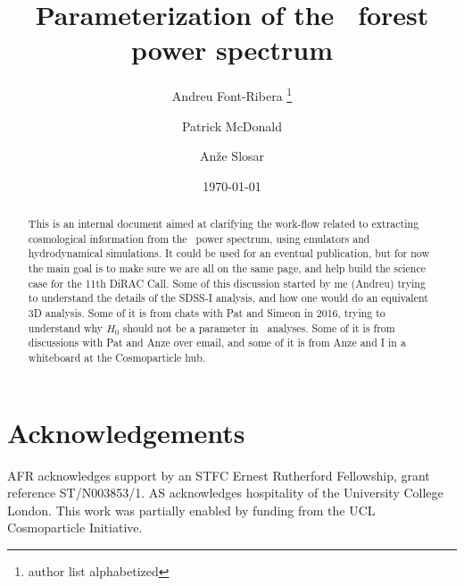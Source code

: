 \documentclass[preprintnumbers,prd,superscriptaddress,notitlepage,nofootinbib] {revtex4-1}
\begin{document}
\title{Parameterization of the \lya\ forest power spectrum}

\author{Andreu Font-Ribera \footnote{author list alphabetized}}
\author{Patrick McDonald}
\author{An\v{z}e Slosar}

\date{\today}

\begin{abstract}
This is an internal document aimed at clarifying the work-flow related to extracting cosmological information 
from the \lya\ power spectrum, using emulators and hydrodynamical simulations.
It could be used for an eventual publication, but for now the main goal is to make sure we are all on the
same page, and help build the science case for the 11th DiRAC Call.
Some of this discussion started by me (Andreu) trying to understand the details of the SDSS-I analysis, 
and how one would do an equivalent 3D analysis. 
Some of it is from chats with Pat and Simeon in 2016, trying to understand why $H_0$ should not be a
parameter in \lya\ analyses. 
Some of it is from discussions with Pat and Anze over email, and some of it is from Anze and I in a
whiteboard at the Cosmoparticle hub.
\end{abstract}

\maketitle











%

%

%

\section*{Acknowledgements}
AFR acknowledges support by an STFC Ernest Rutherford Fellowship, grant reference ST/N003853/1.
AS acknowledges hospitality of the University College London.
This work was partially enabled by funding from the UCL Cosmoparticle
Initiative.




\appendix


\end{document}
